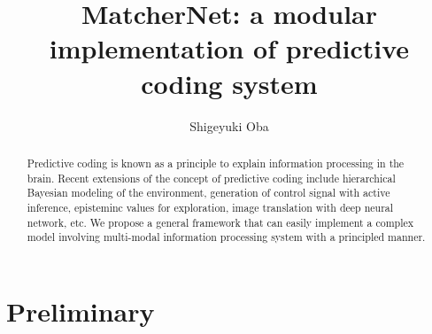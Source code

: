 \documentclass{article}
\begin{document}
\title{MatcherNet: a modular implementation of predictive coding system}
\author{Shigeyuki Oba}

%
%
%
%
%

\maketitle              %

\begin{abstract}
Predictive coding is known as a principle to explain information processing in the brain.
Recent extensions of the concept of predictive coding include hierarchical Bayesian modeling of the environment, generation of control signal with active inference, episteminc values for exploration, image translation with deep neural network, etc. 
We propose a general framework that can easily implement a complex model involving multi-modal information processing system with a principled manner.  

\end{abstract}
%

\newcommand{\vect}[1]{{\bf #1}}
\newcommand{\vA}[0]{\vect{A}}
\newcommand{\vB}[0]{\vect{B}}
\newcommand{\vC}[0]{\vect{C}}
\newcommand{\vF}[0]{\vect{F}}
\newcommand{\vK}[0]{\vect{K}}
\newcommand{\vS}[0]{\vect{S}}
\newcommand{\vQ}[0]{\vect{Q}}
\newcommand{\vR}[0]{\vect{R}}
\newcommand{\T}[0]{{{}^{\rm T}}}
\newcommand{\vu}[0]{\vect{u}}
\newcommand{\vv}[0]{\vect{v}}
\newcommand{\vw}[0]{\vect{w}}
\newcommand{\vx}[0]{\vect{x}}
\newcommand{\vy}[0]{\vect{y}}
\newcommand{\vz}[0]{\vect{z}}
\newcommand{\vmu}{{\boldsymbol{\mu}}}
\newcommand{\vSigma}{{\boldsymbol{\Sigma}}}
\newcommand{\Real}{\mathbb{R}}

\section{Preliminary}
\end{document}
